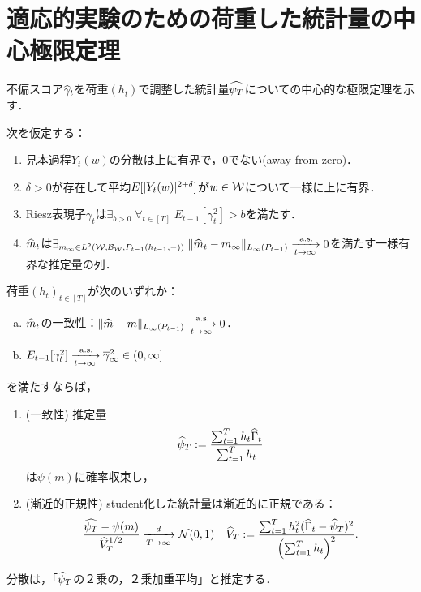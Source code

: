 \documentclass[uplatex,dvipdfmx]{jsreport}
\begin{document}
\section{適応的実験のための荷重した統計量の中心極限定理}

\begin{tcolorbox}[colframe=ForestGreen, colback=ForestGreen!10!white,breakable,colbacktitle=ForestGreen!40!white,coltitle=black,fonttitle=\bfseries\sffamily,
title=]
    不偏スコア$\widehat{\gamma}_t$を荷重$(h_t)$で調整した統計量$\widehat{\psi_T}$についての中心的な極限定理を示す．
\end{tcolorbox}

\begin{theorem}[中心的極限定理]\label{thm-CLT-for-adaptive}
    次を仮定する：
    \begin{enumerate}
        \item 見本過程$Y_t(w)$の分散は上に有界で，$0$でない(away from zero)．
        \item $\delta>0$が存在して平均$E[\lvert Y_t(w)\rvert^{2+\delta}]$が$w\in\mathcal{W}$について一様に上に有界．
        \item Riesz表現子$\gamma_t$は$\exists_{b>0}\;\forall_{t\in[T]}\;E_{t-1}[\gamma^2_t]>b$を満たす．
        \item $\widehat{m}_t$は$\exists_{m_\infty\in L^2(\mathcal{W},\mathcal{B}_{\mathcal{W}},P_{t-1}(h_{t-1},-))}\;\|\widehat{m}_t-m_\infty\|_{L_\infty(P_{t-1})}\xrightarrow[t\to\infty]{\;\mathrm{a.s.}}0$を満たす一様有界な推定量の列．
    \end{enumerate}
    荷重$(h_t)_{t\in[T]}$が次のいずれか：
    \begin{enumerate}[(a)]
        \item $\widehat{m}_t$の一致性：$\|\widehat{m}-m\|_{L_\infty(P_{t-1})}\xrightarrow[t\to\infty]{\;\mathrm{a.s.}}0$．
        \item $E_{t-1}[\gamma_t^2]\xrightarrow[t\to\infty]{\;\mathrm{a.s.}}\overline{\gamma}^2_\infty\in(0,\infty]$
    \end{enumerate}
    を満たすならば，
    \begin{enumerate}
        \item (一致性) 推定量
        \[\widehat{\psi}_T:=\frac{\sum^T_{t=1}h_t\widehat{\Gamma}_t}{\sum^T_{t=1}h_t}\]
        は$\psi(m)$に確率収束し，
        \item (漸近的正規性) student化した統計量は漸近的に正規である：
        \[\frac{\widehat{\psi_T}-\psi(m)}{\widehat{V}_T^{1/2}}\xrightarrow[T\to\infty]{d}\mathcal{N}(0,1)\quad\widehat{V}_T:=\frac{\sum^T_{t=1}h_t^2(\widehat{\Gamma}_t-\widehat{\psi}_T)^2}{\left(\sum^T_{t=1}h_t\right)^2}.\]
    \end{enumerate}
\end{theorem}
\begin{remarks}
    分散は，「$\widehat{\psi}_T$の２乗の，２乗加重平均」と推定する．
\end{remarks}
\end{document}
